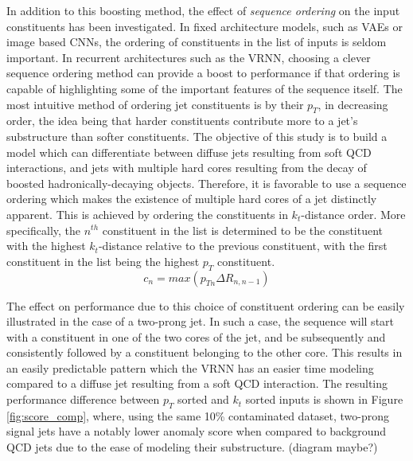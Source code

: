 \documentclass[12pt, a4paper]{article}
\begin{document}
In addition to this boosting method, the effect of \textit{sequence ordering} on the input constituents has been investigated. In fixed architecture models, such as VAEs or image based CNNs, the ordering of constituents in the list of inputs is seldom important. In recurrent architectures such as the VRNN, choosing a clever sequence ordering method can provide a boost to performance if that ordering is capable of highlighting some of the important features of the sequence itself. The most intuitive method of ordering jet constituents is by their $p_{T}$, in decreasing order, the idea being that harder constituents contribute more to a jet's substructure than softer constituents. The objective of this study is to build a model which can differentiate between diffuse jets resulting from soft QCD interactions, and jets with multiple hard cores resulting from the decay of boosted hadronically-decaying objects. Therefore, it is favorable to use a sequence ordering which makes the existence of multiple hard cores of a jet distinctly apparent. This is achieved by ordering the constituents in $k_{t}$-distance order. More specifically, the $n^{th}$ constituent in the list is determined to be the constituent with the highest $k_{t}$-distance relative to the previous constituent, with the first constituent in the list being the highest $p_{T}$ constituent.
\begin{equation}
	c_{n} = max(p_{Tn}\Delta R_{n, n-1})
\end{equation}

The effect on performance due to this choice of constituent ordering can be easily illustrated in the case of a two-prong jet. In such a case, the sequence will start with a constituent in one of the two cores of the jet, and be subsequently and consistently followed by a constituent belonging to the other core. This results in an easily predictable pattern which the VRNN has an easier time modeling compared to a diffuse jet resulting from a soft QCD interaction. The resulting performance difference between $p_{T}$ sorted and $k_{t}$ sorted inputs is shown in Figure \ref{fig:score_comp}, where, using the same 10\% contaminated dataset, two-prong signal jets have a notably lower anomaly score when compared to background QCD jets due to the ease of modeling their substructure. (diagram maybe?)
\end{document}
